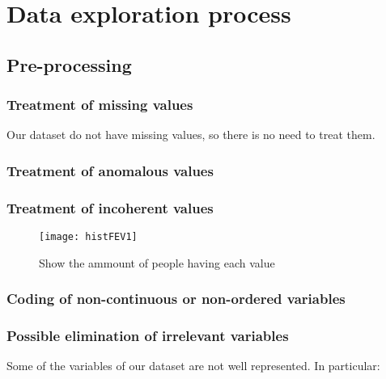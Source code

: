 

\section{Data exploration process}

\subsection{Pre-processing}
\subsubsection{Treatment of missing values}
Our dataset do not have missing values, so there is no need to treat them.
\subsubsection{Treatment of anomalous values}
\subsubsection{Treatment of incoherent values}
\begin{figure}[bh]
\centering
\texttt{[image: histFEV1]}
\label{fig:histFEV1}
\caption{Show the ammount of people having each value}
\end{figure}
\subsubsection{Coding of non-continuous or non-ordered variables}
\subsubsection{Possible elimination of irrelevant variables}

Some of the variables of our dataset are not well represented. In particular:


